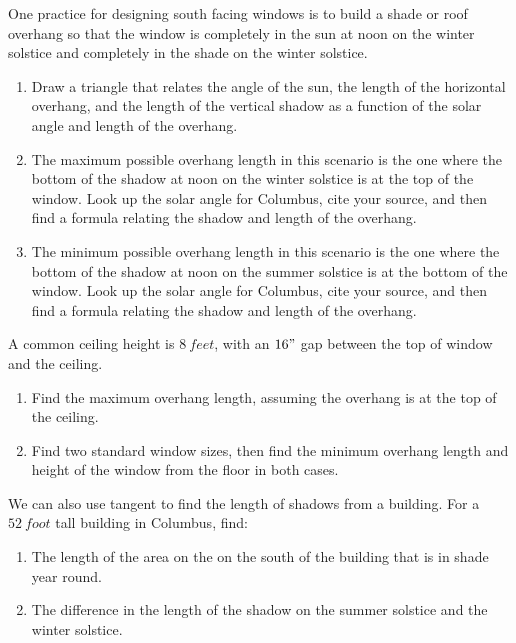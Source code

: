\documentclass[noauthor,nooutcomes,handout,hints]{ximera}
\begin{document}
\mynewpage


\begin{question}
 One practice for designing south facing windows is to build a shade or roof overhang so that the window is completely in the sun at noon on the winter solstice and completely in the shade on the winter solstice. 
 
\begin{enumerate}
\item Draw a triangle that relates the angle of the sun, the length of the horizontal overhang, and the length of the vertical shadow as a function of the solar angle and length of the overhang.
\item The maximum possible overhang length in this scenario is the one where the bottom of the shadow at noon on the winter solstice is at the top of the window. Look up the solar angle for Columbus, cite your source, and then find a formula relating the shadow and length of the overhang.
\item The minimum possible overhang length in this scenario is the one where the bottom of the shadow at noon on the summer solstice is at the bottom of the window. Look up the solar angle for Columbus, cite your source, and then find a formula relating the shadow and length of the overhang.
\end{enumerate}
\end{question}
\mynewpage


\begin{question}
 A common ceiling height is $8\ feet$, with an $16"$ gap between the top of window and the ceiling. 
 
\begin{enumerate}
 \item Find the maximum overhang length, assuming the overhang is at the top of the ceiling.
 \item Find two standard window sizes, then find the minimum overhang length and height of the window from the floor in both cases.
\end{enumerate}
\end{question}
\mynewpage

\begin{question}
 We can also use tangent to find the length of shadows from a building. For a $52\ foot$ tall building in Columbus, find:
 
\begin{enumerate}
 \item The length of the area on the on the south of the building that is in shade year round.
 \item The difference in the length of the shadow on the summer solstice and the winter solstice.
\end{enumerate}
\end{question}
\end{document}
